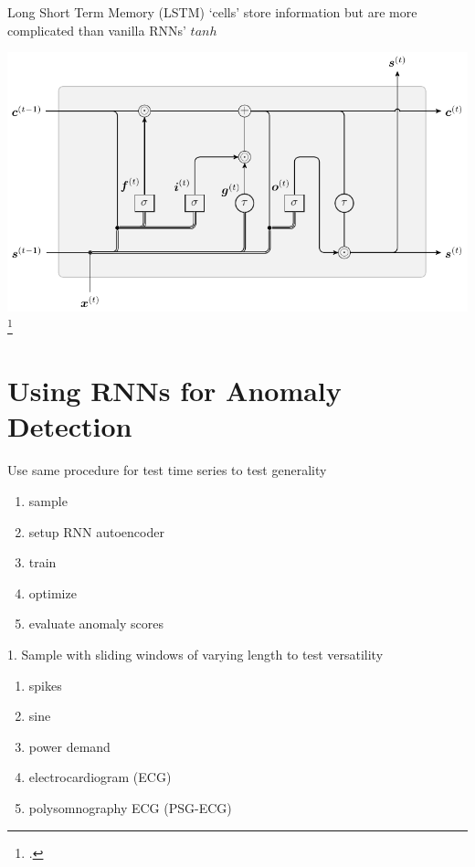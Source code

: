 \documentclass{beamer}
\begin{document}
    \begin{frame}{Long Short Term Memory (LSTM) `cells' store information but are more complicated than vanilla RNNs' $tanh$}

      \includegraphics[width=\textwidth]{figs/lstm.pdf}
      \footcite{Colah2015}
    \end{frame}



    \section{Using RNNs for Anomaly Detection}

    \begin{frame}{Use same procedure for test time series to test generality}
      
      \begin{enumerate}
      \item sample
      \item setup RNN autoencoder
      \item train
      \item optimize
      \item evaluate anomaly scores
      \end{enumerate}

    \end{frame}


    \begin{frame}{1. Sample with sliding windows of varying length to test versatility}
      
      \begin{enumerate}
      \item spikes
      \item sine
      \item power demand
      \item electrocardiogram (ECG)
      \item polysomnography ECG (PSG-ECG)
      \end{enumerate}

    \end{frame}
\end{document}
